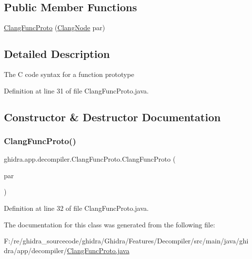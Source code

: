 \subsection*{Public Member Functions}
\begin{DoxyCompactItemize}
\item 
\mbox{\hyperlink{classghidra_1_1app_1_1decompiler_1_1_clang_func_proto_ad35955f35989db207ba4cc1703c81814}{Clang\+Func\+Proto}} (\mbox{\hyperlink{interfaceghidra_1_1app_1_1decompiler_1_1_clang_node}{Clang\+Node}} par)
\end{DoxyCompactItemize}


\subsection{Detailed Description}
The C code syntax for a function prototype 

Definition at line 31 of file Clang\+Func\+Proto.\+java.



\subsection{Constructor \& Destructor Documentation}
\mbox{\label{classghidra_1_1app_1_1decompiler_1_1_clang_func_proto_ad35955f35989db207ba4cc1703c81814}} 
\subsubsection{\texorpdfstring{ClangFuncProto()}{ClangFuncProto()}}
{\footnotesize\ttfamily ghidra.\+app.\+decompiler.\+Clang\+Func\+Proto.\+Clang\+Func\+Proto (\begin{DoxyParamCaption}\item[{\mbox{\hyperlink{interfaceghidra_1_1app_1_1decompiler_1_1_clang_node}{Clang\+Node}}}]{par }\end{DoxyParamCaption})\hspace{0.3cm}{\ttfamily [inline]}}



Definition at line 32 of file Clang\+Func\+Proto.\+java.



The documentation for this class was generated from the following file\+:\begin{DoxyCompactItemize}
\item 
F\+:/re/ghidra\+\_\+sourcecode/ghidra/\+Ghidra/\+Features/\+Decompiler/src/main/java/ghidra/app/decompiler/\mbox{\hyperlink{_clang_func_proto_8java}{Clang\+Func\+Proto.\+java}}\end{DoxyCompactItemize}
